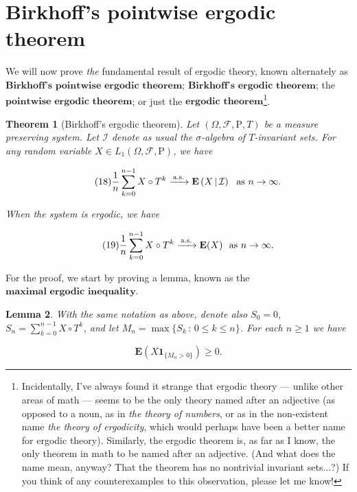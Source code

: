 \documentclass[11pt]{report}
\theoremstyle{plain}
\newtheorem{thm}{Theorem}[chapter]
\newtheorem{lem}[thm]{Lemma}
\theoremstyle{definition}
\begin{document}
\section{Birkhoff's pointwise ergodic theorem}
We will now prove \emph{the} fundamental result of ergodic theory, known alternately as  $\textbf{Birkhoff's pointwise ergodic theorem}$; $\textbf{Birkhoff's ergodic theorem}$; the $\textbf{pointwise ergodic theorem}$; or just the $\textbf{ergodic theorem}$\footnote{Incidentally, I've always found it strange that ergodic theory --- unlike other areas of math --- seems to be the only theory named after an adjective (as opposed to a noun, as in \emph{the theory of numbers}, or as in the non-existent name \emph{the theory of ergodicity}, which would perhaps have been a better name for ergodic theory). Similarly, the ergodic theorem is, as far as I know, the only theorem in math to be named after an adjective. (And what does the name mean, anyway? That the theorem has no nontrivial invariant sets...?) If you think of any counterexamples to this observation, please let me know!}.

\begin{thm}[Birkhoff's ergodic theorem]
Let $(\Omega, \mathcal{F}, \mathrm{P}, T)$ be a measure preserving system. Let $\mathcal{I}$ denote as usual the $\sigma$-algebra of $T$-invariant sets. For any random variable $X \in L_1(\Omega, \mathcal{F}, \mathrm{P})$, we have

\begin{equation*} \tag{18}\label{eq:birkhoffergodic1}
\frac{1}{n} \sum_{k=0}^{n-1} X\circ T^k \xrightarrow[]{\textrm{\,a.s.\,}} \mathbf{E}\left(X\,|\,\mathcal{I}\right)\ \textrm{ as }n\to\infty.
\end{equation*}

When the system is ergodic, we have

\begin{equation*} \tag{19}\label{eq:birkhoffergodic2}
\frac{1}{n} \sum_{k=0}^{n-1} X\circ T^k \xrightarrow[]{\textrm{\,a.s.\,}} \mathbf{E}(X)\ \textrm{ as }n\to\infty.
\end{equation*}

\end{thm}

For the proof, we start by proving a lemma, known as the $\textbf{maximal ergodic inequality}$.

\begin{lem}
\label{lem-ergodic-maximal}
With the same notation as above, denote also $S_0=0$, $S_n  = \sum_{k=0}^{n-1} X\circ T^k$, and let $M_n=\max\{ S_k \,:\,0\le k\le n\}$. For each $n\ge1$ we have

\[
\mathbf{E}(X \mathbf{1}_{\{M_n > 0 \}}) \ge 0.
\]

\end{lem}
\end{document}
